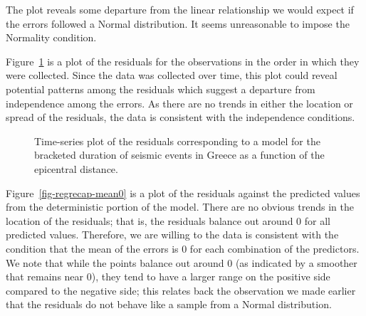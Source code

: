 \documentclass[
  letterpaper,
  DIV=11,
  numbers=noendperiod]{scrreprt}
\theoremstyle{plain}
\theoremstyle{definition}
\theoremstyle{definition}
\theoremstyle{remark}
\begin{document}
The plot reveals some departure from the linear relationship we would
expect if the errors followed a Normal distribution. It seems
unreasonable to impose the Normality condition.

Figure~\ref{fig-regrecap-indep} is a plot of the residuals for the
observations in the order in which they were collected. Since the data
was collected over time, this plot could reveal potential patterns among
the residuals which suggest a departure from independence among the
errors. As there are no trends in either the location or spread of the
residuals, the data is consistent with the independence conditions.

\begin{figure}


\caption{\label{fig-regrecap-indep}Time-series plot of the residuals
corresponding to a model for the bracketed duration of seismic events in
Greece as a function of the epicentral distance.}

\end{figure}%

Figure~\ref{fig-regrecap-mean0} is a plot of the residuals against the
predicted values from the deterministic portion of the model. There are
no obvious trends in the location of the residuals; that is, the
residuals balance out around 0 for all predicted values. Therefore, we
are willing to the data is consistent with the condition that the mean
of the errors is 0 for each combination of the predictors. We note that
while the points balance out around 0 (as indicated by a smoother that
remains near 0), they tend to have a larger range on the positive side
compared to the negative side; this relates back the observation we made
earlier that the residuals do not behave like a sample from a Normal
distribution.
\end{document}
